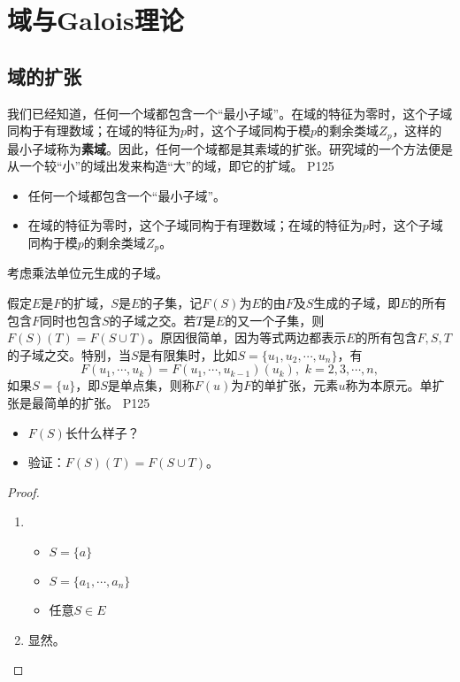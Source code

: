 \section{域与Galois理论}

\subsection{域的扩张}

\original
{
	我们已经知道，任何一个域都包含一个“最小子域”。在域的特征为零时，这个子域同构于有理数域；在域的特征为$p$时，这个子域同构于模$p$的剩余类域$Z_{p}$，这样的最小子域称为\textbf{素域}。因此，任何一个域都是其素域的扩张。研究域的一个方法便是从一个较“小”的域出发来构造“大”的域，即它的扩域。
}
{P125}
\begin{proposition}
	\begin{itemize}
		\item 任何一个域都包含一个“最小子域”。
		\item 在域的特征为零时，这个子域同构于有理数域；在域的特征为$p$时，这个子域同构于模$p$的剩余类域$Z_{p}$。
	\end{itemize}
\end{proposition}

\begin{hint}
	考虑乘法单位元生成的子域。
\end{hint}

\original
{
	假定$E$是$F$的扩域，$S$是$E$的子集，记$F(S)$为$E$的由$F$及$S$生成的子域，即$E$的所有包含$F$同时也包含$S$的子域之交。若$T$是$E$的又一个子集，则$F(S)(T)=F(S\cup T)$。原因很简单，因为等式两边都表示$E$的所有包含$F,S,T$的子域之交。特别，当$S$是有限集时，比如$S=\{u_{1},u_{2},\cdots,u_{n}\}$，有
	\begin{equation*}
		F(u_{1},\cdots,u_{k})=F(u_{1},\cdots,u_{k-1})(u_{k}),\,\, k=2,3,\cdots ,n,
	\end{equation*}
	如果$S=\{u\}$，即$S$是单点集，则称$F(u)$为$F$的单扩张，元素$u$称为本原元。单扩张是最简单的扩张。
}
{P125}

\begin{proposition}
	\begin{itemize}
		\item $F(S)$长什么样子？
		\item 验证：$F(S)(T)=F(S\cup T)$。
	\end{itemize}
\end{proposition}

\begin{proof}
	\begin{enumerate}
		\item\begin{itemize}
			\item $S=\{a\}$
			\item $S=\{a_{1},\cdots,a_{n}\}$
			\item 任意$S\in E$		      \end{itemize}
		\item 显然。
	\end{enumerate}
\end{proof}

